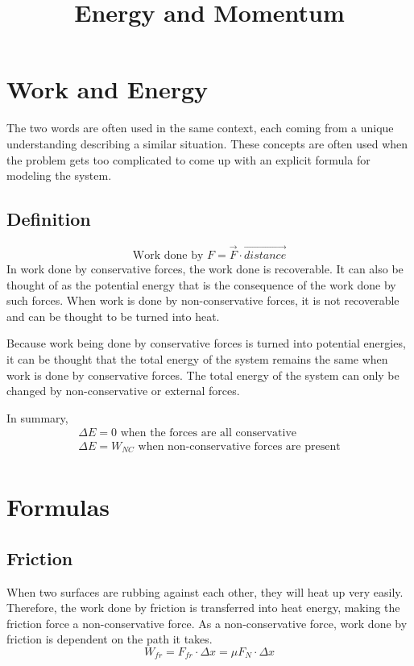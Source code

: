 \documentclass[]{article}
\title{Energy and Momentum}
\author{}
\begin{document}
\maketitle
\section{Work and Energy}\label{sec:work-and-energy}
The two words are often used in the same context, each coming from a unique understanding describing a similar situation.
These concepts are often used when the problem gets too complicated to come up with an explicit formula for modeling the system.

\subsection{Definition}\label{subsec:definition}
\[\text{Work done by } F = \vec{F} \cdot \vec{distance}\]
	 In work done by conservative forces, the work done is recoverable.
	It can also be thought of as the potential energy that is the consequence of the work done by such forces.
	When work is done by non-conservative forces, it is not recoverable and can be thought to be turned into heat. 

	Because work being done by conservative forces is turned into potential energies, it can be thought that the total energy of the system remains the same when work is done by conservative forces.
	The total energy of the system can only be changed by non-conservative or external forces.
	
	In summary,
	\begin{gather*}
	    \Delta E = 0 \text{ when the forces are all conservative}\\
	    \Delta E = W_{NC} \text{ when non-conservative forces are present}\\
	\end{gather*}
\section{Formulas}\label{sec:formulas}

\subsection{Friction}\label{subsec:friction}
When two surfaces are rubbing against each other, they will heat up very easily.
Therefore, the work done by friction is transferred into heat energy, making the friction force a non-conservative force.
As a non-conservative force, work done by friction is dependent on the path it takes.
	\[W_{fr} = F_{fr}\cdot \Delta x = \mu F_N \cdot \Delta x\]
\end{document}

